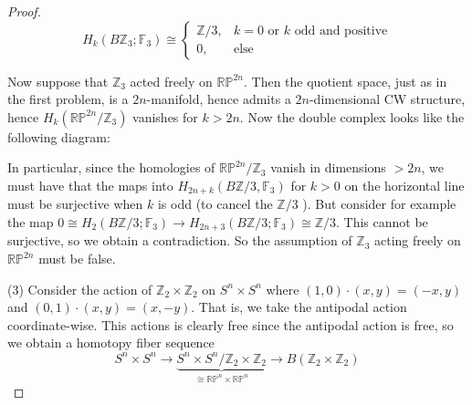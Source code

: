 \documentclass[reqno]{amsart}
\theoremstyle{definition}
\theoremstyle{remark}
\begin{document}
\begin{proof}
\[
H_k \left( B\mathbb{Z}_3 ; \mathbb{F}_3 \right) 
\cong
\begin{cases}
    \mathbb{Z}/3,& k=0 \text{ or } k \text{ odd and positive}\\
    0,& \text{else}
\end{cases}
\] 

Now suppose that
$\mathbb{Z}_3$ acted freely on
$\mathbb{R}\mathbb{P}^{2n}$.
Then the quotient space, just as in the first problem,
is a $2n$-manifold, hence admits
a $2n$-dimensional CW structure, hence
$H_k(\mathbb{R}\mathbb{P}^{2n}/ \mathbb{Z}_3)$ vanishes
for $k>2n$.
Now the double complex looks like the following diagram:


In particular,
since the homologies
of $\mathbb{R}\mathbb{P}^{2n}/ \mathbb{Z}_3$ vanish
in dimensions $>2n$, we must have that
the maps
into $H_{2n+k}\left( B\mathbb{Z}/3, \mathbb{F}_3 \right) $ 
for $k>0$
on the horizontal line must be surjective when
$k$ is odd (to cancel the $\mathbb{Z}/3$ ).
But consider for example the map
$0 \cong H_2 \left( B \mathbb{Z}/3; \mathbb{F}_3 \right) 
\to H_{2n+3}\left( B\mathbb{Z}/3; \mathbb{F}_3 \right) \cong
\mathbb{Z} / 3$. This cannot be surjective, so
we obtain a contradiction. So the
assumption of $\mathbb{Z}_3$ acting freely
on $\mathbb{R}\mathbb{P}^{2n}$ must be false.\\
\linebreak

(3)
Consider the action of
$\mathbb{Z}_2 \times \mathbb{Z}_2$ on
$S^{n} \times S^{n}$ where
$(1,0) \cdot (x,y) = (-x,y)$ and
$(0,1) \cdot (x,y) = (x,-y)$. That is, we take
the antipodal action coordinate-wise. This actions is
clearly free since the antipodal action is free, so
we obtain a homotopy fiber sequence
\[
S^{n} \times S^{n} \to 
\underbrace{S^{n} \times S^{n} / \mathbb{Z}_2 \times 
\mathbb{Z}_2}_{\cong \mathbb{R}\mathbb{P}^{n} \times 
\mathbb{R}\mathbb{P}^{n}} \to 
B \left( \mathbb{Z}_2 \times \mathbb{Z}_2 \right) 
\] 


\end{proof}
\end{document}
